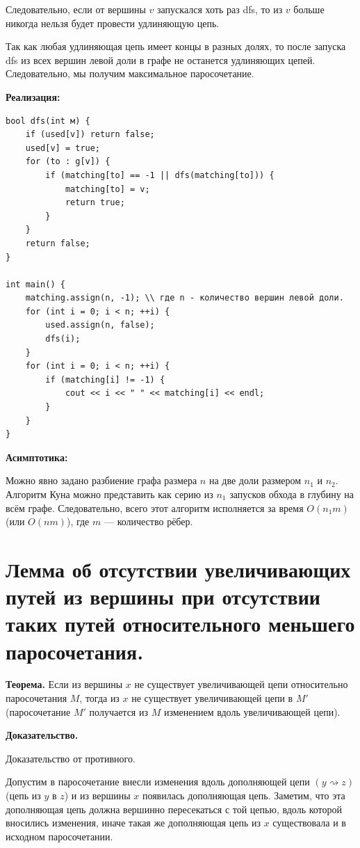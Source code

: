 Следовательно, если от вершины $v$ запускался хоть раз dfs, то из $v$ больше никогда нельзя будет провести удлиняющую цепь.

Так как любая удлиняющая цепь имеет концы в разных долях, то после запуска dfs из всех вершин левой доли в графе не останется удлиняющих цепей. Следовательно, мы получим максимальное паросочетание. 

\textbf{Реализация:}
        
\begin{lstlisting}
bool dfs(int м) {
    if (used[v]) return false;
    used[v] = true;
    for (to : g[v]) {
        if (matching[to] == -1 || dfs(matching[to])) {
            matching[to] = v;
            return true; 
        }
    }
    return false;
}
 	
int main() {
    matching.assign(n, -1); \\ где n - количество вершин левой доли. 
    for (int i = 0; i < n; ++i) {
        used.assign(n, false);
        dfs(i);
    }
    for (int i = 0; i < n; ++i) {
      	if (matching[i] != -1) {
           	cout << i << " " << matching[i] << endl;
        }
    }
}
\end{lstlisting}

\textbf{Асимптотика:}

        Можно явно задано разбиение графа размера $n$ на две доли размером $n_1$ и $n_2$. Алгоритм Куна можно представить как серию из $n_1$ запусков обхода в глубину на всём графе.
        Следовательно, всего этот алгоритм исполняется за время $O(n_1m)$ (или $O(nm)$), где $m$ {{---}} количество рёбер.


\setcounter{section}{67}
\section{Лемма об отсутствии увеличивающих путей из вершины при отсутствии таких путей относительного меньшего паросочетания.}

        \textbf{Теорема.}  Если из вершины $x$ не существует увеличивающей цепи относительно паросочетания $M$, тогда из $x$ не существует увеличивающей цепи в $M'$ (паросочетание $M'$ получается из $M$ изменением вдоль увеличивающей цепи).
        
        \textbf{Доказательство.}
        
        Доказательство от противного.

        Допустим в паросочетание внесли изменения вдоль дополняющей цепи $(y \rightsquigarrow z)$ (цепь из $y$ в $z$) и из вершины $x$ появилась дополняющая цепь.
        Заметим, что эта дополняющая цепь должна вершинно пересекаться с той цепью, вдоль которой вносились изменения, иначе такая же дополняющая цепь из $x$ существовала и в исходном паросочетании.
        
